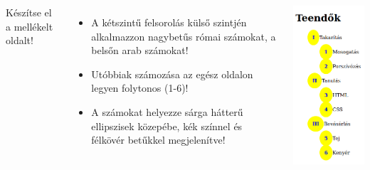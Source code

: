 \begin{frame}
  \begin{columns}[c]
      Készítse el a mellékelt  oldalt!
      \begin{itemize}
        \item A kétszintű felsorolás külső szintjén alkalmazzon nagybetűs római számokat, a belsőn arab számokat!
        \item Utóbbiak számozása az egész oldalon legyen folytonos (1-6)!
        \item A számokat helyezze sárga hátterű ellipszisek közepébe, kék színnel és félkövér betűkkel megjelenítve!
      \end{itemize}
      \includegraphics[width=\textwidth]{teendok.png}
  \end{columns}
\end{frame}
